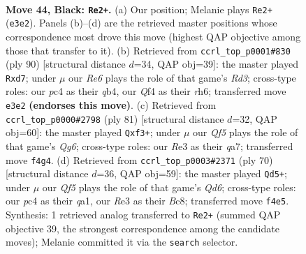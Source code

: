 \documentclass[11pt]{article}
\begin{document}
\clearpage

\begin{figure}[p]\centering
\begin{subfigure}{0.46\textwidth}\centering
\resizebox{\linewidth}{!}{%
\newchessgame
\chessboard[
  setfen={6k1/2p2p2/8/6P1/2P1Pq2/4r3/6K1/8 b - - 1 44},
  showmover=false,
  pgfstyle=straightmove, color=movearrow, markmove={e3-e2}
]}
\caption{}
\end{subfigure}\hfill
\begin{subfigure}{0.46\textwidth}\centering
\resizebox{\linewidth}{!}{%
\newchessgame
\chessboard[
  setfen={7k/p2n1p2/7r/5Q1P/1q6/3R4/6P1/6K1 w - - 0 46},
  showmover=false,
  pgfstyle=straightmove, color=movearrow, markmove={d3-d7}
]}
\caption{}
\end{subfigure}
\\[4pt]
\begin{subfigure}{0.46\textwidth}\centering
\resizebox{\linewidth}{!}{%
\newchessgame
\chessboard[
  setfen={8/Q7/p7/6p1/8/P1P2PqP/8/k6K b - - 0 41},
  showmover=false,
  pgfstyle=straightmove, color=movearrow, markmove={g3-f3}
]}
\caption{}
\end{subfigure}\hfill
\begin{subfigure}{0.46\textwidth}\centering
\resizebox{\linewidth}{!}{%
\newchessgame
\chessboard[
  setfen={2B5/3p3p/1p1Q4/7k/1P5n/8/4KP1P/q7 w - - 7 36},
  showmover=false,
  pgfstyle=straightmove, color=movearrow, markmove={d6-d5}
]}
\caption{}
\end{subfigure}
\caption{\textbf{Move 44, Black: \texttt{Re2+}.} (a) Our position; Melanie plays \texttt{Re2+} (\texttt{e3e2}). Panels (b)--(d) are the retrieved master positions whose correspondence most drove this move (highest QAP objective among those that transfer to it). (b) Retrieved from \texttt{ccrl\_top\_p0001\#830} (ply 90) [structural distance $d$=34, QAP obj=39]: the master played \texttt{Rxd7}; under $\mu$ our \emph{Re6} plays the role of that game's \emph{Rd3}; cross-type roles: our \emph{p}c4 as their \emph{q}b4, our \emph{Q}f4 as their \emph{r}h6; transferred move \texttt{e3e2} \textbf{(endorses this move)}. (c) Retrieved from \texttt{ccrl\_top\_p0000\#2798} (ply 81) [structural distance $d$=32, QAP obj=60]: the master played \texttt{Qxf3+}; under $\mu$ our \emph{Qf5} plays the role of that game's \emph{Qg6}; cross-type roles: our \emph{R}e3 as their \emph{q}a7; transferred move \texttt{f4g4}. (d) Retrieved from \texttt{ccrl\_top\_p0003\#2371} (ply 70) [structural distance $d$=36, QAP obj=59]: the master played \texttt{Qd5+}; under $\mu$ our \emph{Qf5} plays the role of that game's \emph{Qd6}; cross-type roles: our \emph{p}c4 as their \emph{q}a1, our \emph{R}e3 as their \emph{B}c8; transferred move \texttt{f4e5}. Synthesis: 1 retrieved analog transferred to \texttt{Re2+} (summed QAP objective 39, the strongest correspondence among the candidate moves); Melanie committed it via the \texttt{search} selector.}
\label{fig:thought-m87}
\end{figure}
\end{document}
